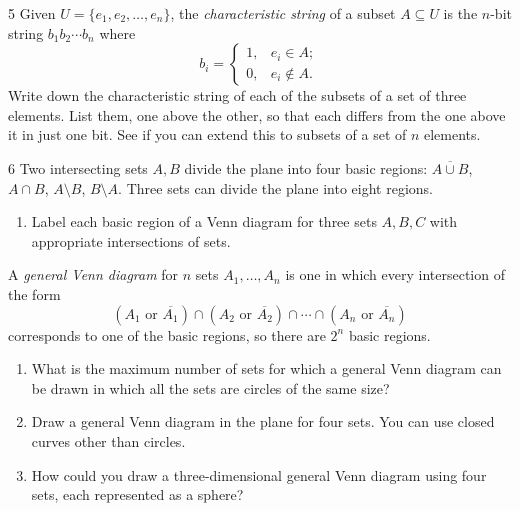 \begin{exercise}{5}
    Given $U=\{e_1,e_2,\dots,e_n\}$, the \emph{characteristic string} of a subset
    $A\subseteq U$ is the $n$-bit string $b_1b_2\cdots b_n$ where
    \[
        b_i = \begin{cases} 1, & e_i\in A;\\ 0, & e_i\notin A.\end{cases}
    \]
    Write down the characteristic string of each of the subsets of a set of three
    elements. List them, one above the other, so that each differs from the one
    above it in just one bit. See if you can extend this to subsets of a set of
    $n$ elements.
\end{exercise}

\begin{exercise}{6}
    Two intersecting sets $A,B$ divide the plane into four basic regions:
    $\overline{A\cup B}$, $A\cap B$, $A\setminus B$, $B\setminus A$. Three sets
    can divide the plane into eight regions.
    \begin{enumerate}[label=(\alph*)]
        \item Label each basic region of a Venn diagram for three sets $A,B,C$
              with appropriate intersections of sets.
    \end{enumerate}
    A \emph{general Venn diagram} for $n$ sets $A_1,\dots,A_n$ is one in which
    every intersection of the form
    \[
        (A_1 \text{ or } \overline{A_1})\cap(A_2\text{ or }\overline{A_2})\cap\cdots
        \cap(A_n\text{ or }\overline{A_n})
    \]
    corresponds to one of the basic regions, so there are $2^n$ basic regions.
    \begin{enumerate}[label=(\alph*),start=2]
        \item What is the maximum number of sets for which a general Venn diagram
              can be drawn in which all the sets are circles of the same size?
        \item Draw a general Venn diagram in the plane for four sets. You can use
              closed curves other than circles.
        \item How could you draw a three-dimensional general Venn diagram using
              four sets, each represented as a sphere?
    \end{enumerate}
\end{exercise}

